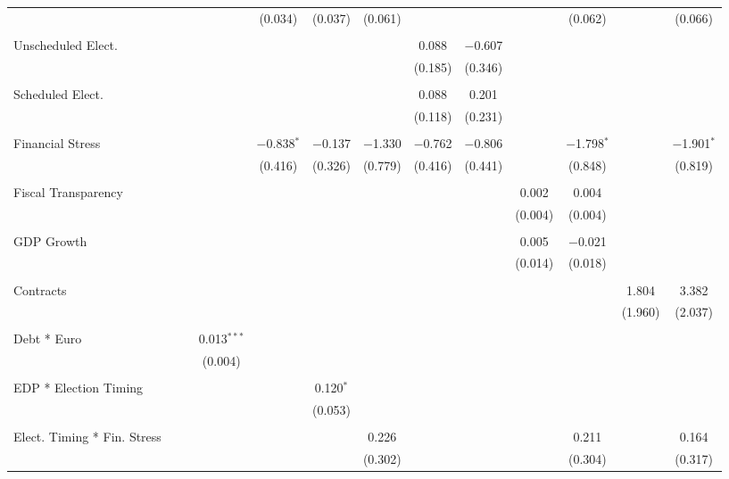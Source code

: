 \begin{table}[!htbp]
\begin{tabular}{@{\extracolsep{5pt}}lcccccccccccc}
  &  &  &  & (0.034) & (0.037) & (0.061) &  &  &  & (0.062) &  & (0.066) \\ 
  & & & & & & & & & & & & \\ 
 Unscheduled Elect. &  &  &  &  &  &  & 0.088 & $-$0.607 &  &  &  &  \\ 
  &  &  &  &  &  &  & (0.185) & (0.346) &  &  &  &  \\ 
  & & & & & & & & & & & & \\ 
 Scheduled Elect. &  &  &  &  &  &  & 0.088 & 0.201 &  &  &  &  \\ 
  &  &  &  &  &  &  & (0.118) & (0.231) &  &  &  &  \\ 
  & & & & & & & & & & & & \\ 
 Financial Stress &  &  &  & $-$0.838$^{*}$ & $-$0.137 & $-$1.330 & $-$0.762 & $-$0.806 &  & $-$1.798$^{*}$ &  & $-$1.901$^{*}$ \\ 
  &  &  &  & (0.416) & (0.326) & (0.779) & (0.416) & (0.441) &  & (0.848) &  & (0.819) \\ 
  & & & & & & & & & & & & \\ 
 Fiscal Transparency &  &  &  &  &  &  &  &  & 0.002 & 0.004 &  &  \\ 
  &  &  &  &  &  &  &  &  & (0.004) & (0.004) &  &  \\ 
  & & & & & & & & & & & & \\ 
 GDP Growth &  &  &  &  &  &  &  &  & 0.005 & $-$0.021 &  &  \\ 
  &  &  &  &  &  &  &  &  & (0.014) & (0.018) &  &  \\ 
  & & & & & & & & & & & & \\ 
 Contracts &  &  &  &  &  &  &  &  &  &  & 1.804 & 3.382 \\ 
  &  &  &  &  &  &  &  &  &  &  & (1.960) & (2.037) \\ 
  & & & & & & & & & & & & \\ 
 Debt * Euro &  &  & 0.013$^{***}$ &  &  &  &  &  &  &  &  &  \\ 
  &  &  & (0.004) &  &  &  &  &  &  &  &  &  \\ 
  & & & & & & & & & & & & \\ 
 EDP * Election Timing &  &  &  &  & 0.120$^{*}$ &  &  &  &  &  &  &  \\ 
  &  &  &  &  & (0.053) &  &  &  &  &  &  &  \\ 
  & & & & & & & & & & & & \\ 
 Elect. Timing * Fin. Stress &  &  &  &  &  & 0.226 &  &  &  & 0.211 &  & 0.164 \\ 
  &  &  &  &  &  & (0.302) &  &  &  & (0.304) &  & (0.317) \\ 

\end{tabular}
\end{table}
